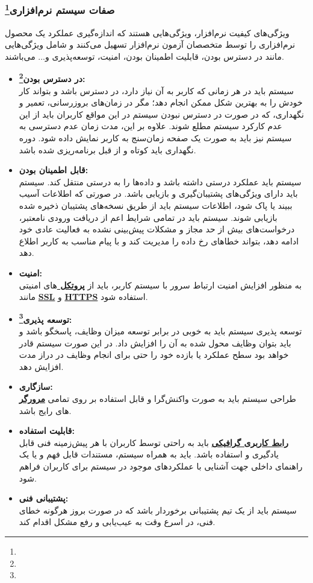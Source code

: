 \documentclass[12pt]{article}
\begin{document}
	\subsubsection{صفات سیستم نرم‌افزاری\footnote{}}
	ویژگی‌های کیفیت نرم‌افزار، ویژگی‌هایی هستند که اندازه‌گیری عملکرد یک محصول نرم‌افزاری را توسط متخصصان آزمون نرم‌افزار تسهیل می‌کنند و شامل ویژگی‌هایی مانند در دسترس بودن، قابلیت اطمینان بودن، امنیت، توسعه‌پذیری و... می‌باشند.
	\begin{itemize}
		\item
		\textbf{در دسترس بودن\footnote{}:}\\
		سیستم باید در هر زمانی که کاربر به آن نیاز دارد، در دسترس باشد و بتواند کار خودش را به بهترین شکل ممکن انجام دهد؛ مگر در زمان‌های بروزرسانی، تعمیر و نگهداری، که در صورت در دسترس نبودن سیستم در این مواقع کاربران باید از این عدم کارکرد سیستم مطلع شوند. علاوه بر این، مدت زمان عدم دسترسی به سیستم نیز باید به صورت یک صفحه زمان‌سنج به کاربر نمایش داده شود. دوره نگهداری باید کوتاه و از قبل برنامه‌ریزی شده باشد.
		\item
		\textbf{قابل اطمینان بودن:}\\
		سیستم باید عملکرد درستی داشته باشد و داده‌ها را به درستی منتقل کند. سیستم باید دارای ویژگی‌های پشتیبان‌گیری و بازیابی باشد. در صورتی که اطلاعات آسیب ببیند یا پاک شود، اطلاعات سیستم باید از طریق نسخه‌های پشتیبان ذخیره شده بازیابی شوند. سیستم باید در تمامی شرایط اعم از دریافت ورودی نامعتبر، درخواست‌های بیش از حد مجاز و مشکلات پیش‌بینی نشده به فعالیت عادی خود ادامه دهد، بتواند خطاهای رخ داده را مدیریت کند و با پیام مناسب به کاربر اطلاع دهد.
		\item
		\textbf{امنیت:}\\
		به منظور افزایش امنیت ارتباط سرور با سیستم کاربر، باید از \textbf{\hyperref[ref:protocol]{پروتکل }}‌های امنیتی مانند \textbf{\hyperref[ref:ssl]{SSL}} و \textbf{\hyperref[ref:https]{HTTPS}} استفاده شود.
		\item
		\textbf{توسعه پذیری\footnote{}:}\\
		توسعه پذیری سیستم باید به خوبی در برابر توسعه میزان وظایف، پاسخگو باشد و باید بتوان وظایف محول شده به آن را افزایش داد. در این صورت سیستم قادر خواهد بود سطح عملکرد یا بازده خود را حتی برای انجام وظایف در دراز مدت افزایش دهد.
		\item
		\textbf{سازگاری:}\\
		طراحی سیستم باید به صورت واکنش‌گرا و قابل استفاده بر روی تمامی
		\textbf{\hyperref[ref:browser]{مرورگر }}
		های رایج باشد.
		\item
		\textbf{قابلیت استفاده:}\\
		\textbf{\hyperref[ref:gui]{رابط کاربری گرافیکی}} باید به راحتی توسط کاربران با هر پیش‌زمینه فنی قابل یادگیری و استفاده باشد. باید به همراه سیستم، مستندات قابل فهم و یا یک راهنمای داخلی جهت آشنایی با عملکردهای موجود در سیستم برای کاربران فراهم شود.
		\item
		\textbf{پشتیبانی فنی:}\\
		سیستم باید از یک تیم پشتیبانی برخوردار باشد که در صورت بروز هرگونه خطای فنی، در اسرع وقت به عیب‌یابی و رفع مشکل اقدام کند.

	\end{itemize}
\end{document}
